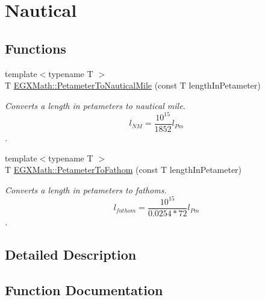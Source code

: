 \hypertarget{group___e_g_x_math-_conversions-_length_conversions-_s_i-_petameter-_nautical}{}\section{Nautical}
\label{group___e_g_x_math-_conversions-_length_conversions-_s_i-_petameter-_nautical}
\subsection*{Functions}
\begin{DoxyCompactItemize}
\item 
{\footnotesize template$<$typename T $>$ }\\T \mbox{\hyperlink{group___e_g_x_math-_conversions-_length_conversions-_s_i-_petameter-_nautical_gad71d96fd4a94e830ae0e768a41d993af}{E\+G\+X\+Math\+::\+Petameter\+To\+Nautical\+Mile}} (const T length\+In\+Petameter)
\begin{DoxyCompactList}\small\item\em Converts a length in petameters to nautical mile. \[ l_{NM}= \frac{10^{15}}{1852} l_{Pm} \]. \end{DoxyCompactList}\item 
{\footnotesize template$<$typename T $>$ }\\T \mbox{\hyperlink{group___e_g_x_math-_conversions-_length_conversions-_s_i-_petameter-_nautical_ga889ce7d71b84adea6f568fed8857fbab}{E\+G\+X\+Math\+::\+Petameter\+To\+Fathom}} (const T length\+In\+Petameter)
\begin{DoxyCompactList}\small\item\em Converts a length in petameters to fathoms. \[ l_{fathom}= \frac{10^{15}}{0.0254 * 72} l_{Pm} \]. \end{DoxyCompactList}\end{DoxyCompactItemize}


\subsection{Detailed Description}


\subsection{Function Documentation}
\mbox{\label{group___e_g_x_math-_conversions-_length_conversions-_s_i-_petameter-_nautical_ga889ce7d71b84adea6f568fed8857fbab}} 
